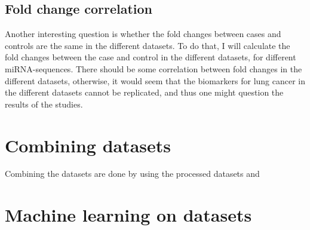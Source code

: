 \subsection{Fold change correlation}
Another interesting question is whether the fold changes between cases and controls are the same in the different datasets. To do that, I will calculate the fold changes between the case and control in the different datasets, for different miRNA-sequences. There should be some correlation between fold changes in the different datasets, otherwise, it would seem that the biomarkers for lung cancer in the different datasets cannot be replicated, and thus one might question the results of the studies. 


\section{Combining datasets}
Combining the datasets are done by using the processed datasets and 


\section{Machine learning on datasets}




\iffalse
Here you will present the architecture or model that you have chosen and that is (or will be) implemented in your work. Note that putting algorithms in your report is not desirable but in certain cases these might be placed in the appendix. Code further be avoided in the report itself but may be delivered in the fashion requested by the supervisor or, in the case of masters delivery, submitted as additional documents. 
\fi
